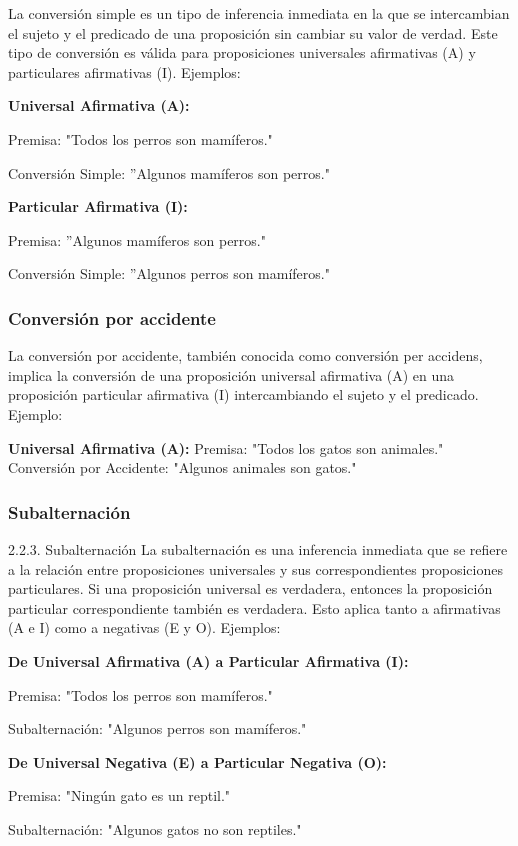 La conversión simple es un tipo de inferencia inmediata en la que se intercambian el sujeto y el predicado de una proposición sin cambiar su valor de verdad. Este tipo de conversión es válida para proposiciones universales afirmativas (A) y particulares afirmativas (I). Ejemplos:

\textbf{Universal Afirmativa (A):}

Premisa: "Todos los perros son mamíferos."

Conversión Simple: ''Algunos mamíferos son perros."

\textbf{Particular Afirmativa (I):}

Premisa: ''Algunos mamíferos son perros."

Conversión Simple: ''Algunos perros son mamíferos."

\subsubsection{Conversión por accidente}

La conversión por accidente, también conocida como conversión per accidens, implica la conversión de una proposición universal afirmativa (A) en una proposición particular afirmativa (I) intercambiando el sujeto y el predicado. Ejemplo:

\textbf{Universal Afirmativa (A):}
Premisa: "Todos los gatos son animales."
Conversión por Accidente: "Algunos animales son gatos."

\subsubsection{Subalternación}
2.2.3. Subalternación
La subalternación es una inferencia inmediata que se refiere a la relación entre proposiciones universales y sus correspondientes proposiciones particulares. Si una proposición universal es verdadera, entonces la proposición particular correspondiente también es verdadera. Esto aplica tanto a afirmativas (A e I) como a negativas (E y O). Ejemplos:

\textbf{De Universal Afirmativa (A) a Particular Afirmativa (I):}

Premisa: "Todos los perros son mamíferos."

Subalternación: "Algunos perros son mamíferos."

\textbf{De Universal Negativa (E) a Particular Negativa (O):}

Premisa: "Ningún gato es un reptil."

Subalternación: "Algunos gatos no son reptiles."

